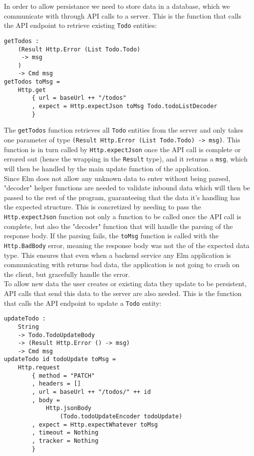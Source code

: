 In order to allow persistance we need to store data in a database, which we communicate with through API calls to a server. This is the function that calls the API endpoint to retrieve existing \texttt{Todo} entities:

\begin{verbatim}
getTodos :
    (Result Http.Error (List Todo.Todo)
     -> msg
    )
    -> Cmd msg
getTodos toMsg =
    Http.get
        { url = baseUrl ++ "/todos"
        , expect = Http.expectJson toMsg Todo.todoListDecoder
        }
\end{verbatim}

The \texttt{getTodos} function retrieves all \texttt{Todo} entities from the server and only takes one parameter of type \texttt{(Result Http.Error (List Todo.Todo) -> msg)}. This function is in turn called by \texttt{Http.expectJson} once the API call is complete or errored out (hence the wrapping in the \texttt{Result} type), and it returns a \texttt{msg}, which will then be handled by the main update function of the application.\\

Since Elm does not allow any unknown data to enter without being parsed, "decoder" helper functions are needed to validate inbound data which will then be passed to the rest of the program, guaranteeing that the data it's handling has the expected structure. This is concretized by needing to pass the \texttt{Http.expectJson} function not only a function to be called once the API call is complete, but also the "decoder" function that will handle the parsing of the response body. If the parsing fails, the \texttt{toMsg} function is called with the \texttt{Http.BadBody} error, meaning the response body was not the of the expected data type. This ensures that even when a backend service any Elm application is communicating with returns bad data, the application is not going to crash on the client, but gracefully handle the error.\\

To allow new data the user creates or existing data they update to be persistent, API calls that send this data to the server are also needed. This is the function that calls the API endpoint to update a \texttt{Todo} entity:

\begin{verbatim}
updateTodo :
    String
    -> Todo.TodoUpdateBody
    -> (Result Http.Error () -> msg)
    -> Cmd msg
updateTodo id todoUpdate toMsg =
    Http.request
        { method = "PATCH"
        , headers = []
        , url = baseUrl ++ "/todos/" ++ id
        , body =
            Http.jsonBody
                (Todo.todoUpdateEncoder todoUpdate)
        , expect = Http.expectWhatever toMsg
        , timeout = Nothing
        , tracker = Nothing
        }
\end{verbatim}

